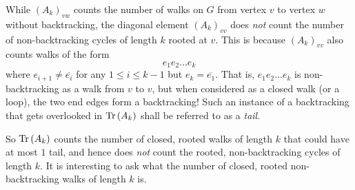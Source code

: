 \begin{description}
While $(A_k)_{vw}$ counts the number of walks on $G$ from vertex $v$ to
vertex $w$ without backtracking, the diagonal element
$(A_k)_{vv}$ does \emph{not} count the number of non-backtracking cycles
of length $k$ rooted at $v$. This is because $(A_k)_{vv}$ also counts
walks of the form
$$e_1 e_2 \dots e_k$$
where $e_{i+1} \neq \overline{e_i}$ for any $1 \leq i \leq k-1$ but
$e_k = \overline{e_1}$. That is, $e_1 e_2 \dots e_k$ is non-backtracking
as a walk from $v$ to $v$, but when considered as a closed walk (or a
loop), the two end edges form a backtracking! Such an instance of a
backtracking that gets overlooked in $\mbox{\rm Tr}\,(A_k)$ shall be referred to as a
\emph{tail}.

So $\mbox{\rm Tr}\,(A_k)$ counts the number of closed, rooted walks
of length $k$ that could have at most $1$ tail, and hence does \emph{not}
count the  rooted, non-backtracking cycles of length $k$. It is
interesting to ask what the number of closed, rooted non-backtracking
walks of length $k$ is.


\end{description}
